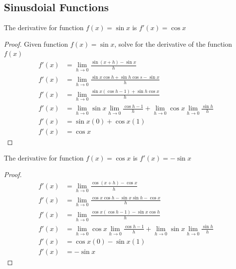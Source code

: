 \subsection{Sinusdoial Functions}
\begin{proposition}
    The derivative for function $f(x) = \sin x$ is $f'(x) = \cos x$
    \begin{proof}
        Given function $f(x) = \sin x$, solve for the derivative of the function $f(x)$
        \begin{align*}
            f'(x) &= \lim_{h \to 0} \frac{
                \sin (x + h) - \sin x
            }{
                h
            } \\
            f'(x) &= \lim_{h \to 0}\frac{
                \sin x \cos h + \sin h \cos s - \sin x
            }{h}\\
            f'(x) &= \lim_{h \to 0}\frac{
                \sin x (\cos h - 1) + \sin h \cos x
            }{h}\\
            f'(x) &= \lim_{h \to 0} \sin x \lim_{h \to 0} \frac{
                \cos h - 1
            }{h} + \lim_{h \to 0} \cos x \lim_{h \to 0} \frac{
                \sin h
            }{h}\\
            f'(x) &= \sin x (0) + \cos x (1)\\
            f'(x) &= \cos x 
        \end{align*}
    \end{proof}
\end{proposition}
\begin{proposition}
    The derivative for function $f(x) = \cos x$ is $f'(x) = -\sin x$
    \begin{proof}
        \begin{align*}
            f'(x) &= \lim_{h \to 0}\frac{
                \cos (x + h) - \cos x
            }{
                h
            }\\
            f'(x) &= \lim_{h \to 0} \frac{
                \cos x \cos h - \sin x \sin h - \cos x
            }{h} \\
            f'(x) &= \lim_{h \to 0} \frac{
                \cos x (\cos h - 1) - \sin x \cos h
            }{
                h
            } \\
            f'(x) &= \lim_{h \to 0} \cos x \lim_{h \to 0} \frac{\cos h - 1}{h} + \lim_{h \to 0} \sin x \lim_{h \to 0}\frac{\sin h}{h} \\
            f'(x) &= \cos x (0) - \sin x (1) \\
            f'(x) &= -\sin x
        \end{align*}
    \end{proof}
\end{proposition}

